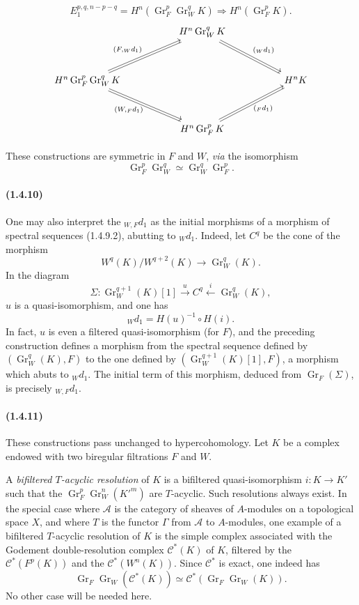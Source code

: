 \documentclass[10pt]{article}
\newcommand{\Gr}{\operatorname{Gr}}
\newcommand{\calA}{\mathcal A}
\begin{document}
\begin{enumerate}[label=\alph*)]
\[E_1^{p,q,n-p-q}=H^n(\Gr_F^p\Gr_W^qK)\Rightarrow H^n(\Gr_F^pK).
\]
\[
\begin{tikzcd}[column sep=5.2em,row sep=3.2em]
& H^n\Gr_W^qK
  \arrow[dr,shift left=1.2pt,"{\scriptstyle({}_Wd_1)}"]
  \arrow[dr,shift right=1.2pt,no head]
& \\
H^n\Gr_F^p\Gr_W^qK
  \arrow[ur,shift left=1.2pt,"{\scriptstyle(F,{}_Wd_1)}"]
  \arrow[ur,shift right=1.2pt,no head]
  \arrow[dr,shift left=1.2pt,"{\scriptstyle(W,{}_Fd_1)}"']
  \arrow[dr,shift right=1.2pt,no head]
&& H^nK \\
& H^n\Gr_F^pK
  \arrow[ur,shift left=1.2pt,"{\scriptstyle({}_Fd_1)}"']
  \arrow[ur,shift right=1.2pt,no head]
&
\end{tikzcd}
\]
\end{enumerate}
These constructions are symmetric in $F$ and $W$, \emph{via} the isomorphism
\[
\Gr_F^p\Gr_W^q\simeq\Gr_W^q\Gr_F^p.
\]

\paragraph{(1.4.10)} One may also interpret the ${}_{W,F}d_1$ as the initial morphisms of a morphism of spectral sequences (1.4.9.2), abutting to ${}_Wd_1$. Indeed, let $C^q$ be the cone of the morphism
\[
W^q(K)/W^{q+2}(K)\longrightarrow\Gr_W^q(K).
\]
In the diagram
\[
\Sigma:\Gr_W^{q+1}(K)[1]\xrightarrow{u} C^q\xleftarrow{i}\Gr_W^q(K),
\]
$u$ is a quasi-isomorphism, and one has
\[
{}_Wd_1=H(u)^{-1}\circ H(i).
\]
In fact, $u$ is even a filtered quasi-isomorphism (for $F$), and the preceding construction defines a morphism from the spectral sequence defined by $(\Gr_W^q(K),F)$ to the one defined by $(\Gr_W^{q+1}(K)[1],F)$, a morphism which abuts to ${}_Wd_1$. The initial term of this morphism, deduced from $\Gr_F(\Sigma)$, is precisely ${}_{W,F}d_1$.

\paragraph{(1.4.11)} These constructions pass unchanged to hypercohomology. Let $K$ be a complex endowed with two biregular filtrations $F$ and $W$.

A \emph{bifiltered $T$-acyclic resolution} of $K$ is a bifiltered quasi-isomorphism $i:K\to K'$ such that the $\Gr_F^p\Gr_W^n(K'^m)$ are $T$-acyclic. Such resolutions always exist. In the special case where $\calA$ is the category of sheaves of $A$-modules on a topological space $X$, and where $T$ is the functor $\Gamma$ from $\calA$ to $A$-modules, one example of a bifiltered $T$-acyclic resolution of $K$ is the simple complex associated with the Godement double-resolution complex $\mathcal C^*(K)$ of $K$, filtered by the $\mathcal C^*(F^p(K))$ and the $\mathcal C^*(W^n(K))$. Since $\mathcal C^*$ is exact, one indeed has
\[
\Gr_F\Gr_W(\mathcal C^*(K))\simeq \mathcal C^*(\Gr_F\Gr_W(K)).
\]
No other case will be needed here.
\end{document}
